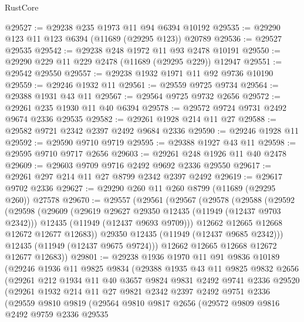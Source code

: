 \begin{lexlean}{RustCore}
\begin{coremodule}
@29527 := @29238 @235 @1973 @11 @94 @6394 @10192
@29535 := @29290 @123 @11 @123 @6394 (@11689 (@29295 @123)) @20789
@29536 := @29527 @29535
@29542 := @29238 @248 @1972 @11 @93 @2478 @10191
@29550 := @29290 @229 @11 @229 @2478 (@11689 (@29295 @229)) @12947
@29551 := @29542 @29550
@29557 := @29238 @1932 @1971 @11 @92 @9736 @10190
@29559 := @29246 @1932 @11
@29561 := @29559 @9725 @9734
@29564 := @29388 @1931 @43 @11
@29567 := @29564 @9725 @9732 @2656
@29572 := @29261 @235 @1930 @11 @40 @6394
@29578 := @29572 @9724 @9731 @2492 @9674 @2336 @29535
@29582 := @29261 @1928 @214 @11 @27
@29588 := @29582 @9721 @2342 @2397 @2492 @9684 @2336
@29590 := @29246 @1928 @11
@29592 := @29590 @9710 @9719
@29595 := @29388 @1927 @43 @11
@29598 := @29595 @9710 @9717 @2656
@29603 := @29261 @248 @1926 @11 @40 @2478
@29609 := @29603 @9709 @9716 @2492 @9692 @2336 @29550
@29617 := @29261 @297 @214 @11 @27 @8799 @2342 @2397 @2492
@29619 := @29617 @9702 @2336
@29627 := @29290 @260 @11 @260 @8799 (@11689 (@29295 @260)) @27578
@29670 := @29557
    (@29561
      (@29567
        (@29578
          (@29588
            (@29592
              (@29598
                (@29609
                  (@29619 @29627 @29350 @12435 (@11949 (@12437 @9703 @2342)))
                  @12435
                  (@11949 (@12437 @9693 @9709)))
                @12662
                @12665
                @12668
                @12672
                @12677
                @12683))
            @29350
            @12435
            (@11949 (@12437 @9685 @2342)))
          @12435
          (@11949 (@12437 @9675 @9724)))
        @12662
        @12665
        @12668
        @12672
        @12677
        @12683))
@29801 := @29238
    @1936
    @1970
    @11
    @91
    @9836
    @10189
    (@29246
      @1936
      @11
      @9825
      @9834
      (@29388
        @1935
        @43
        @11
        @9825
        @9832
        @2656
        (@29261
          @212
          @1934
          @11
          @40
          @3657
          @9824
          @9831
          @2492
          @9741
          @2336
          @29520
          (@29261
            @1932
            @214
            @11
            @27
            @9821
            @2342
            @2397
            @2492
            @9751
            @2336
            (@29559
              @9810
              @9819
              (@29564
                @9810
                @9817
                @2656
                (@29572
                  @9809
                  @9816
                  @2492
                  @9759
                  @2336
                  @29535

\end{coremodule}
\end{lexlean}
